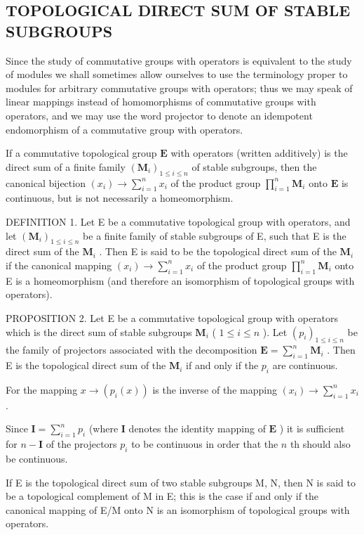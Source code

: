 \subsection{TOPOLOGICAL DIRECT SUM OF STABLE SUBGROUPS}

Since the study of commutative groups with operators is equivalent to the study of modules we shall sometimes allow ourselves to use the terminology proper to modules for arbitrary commutative groups with operators; thus we may speak of linear mappings instead of homomorphisms of commutative groups with operators, and we may use the word projector to denote an idempotent endomorphism of a commutative group with operators.

If a commutative topological group \(\mathbf{E}\) with operators (written additively) is the direct sum of a finite family \((\mathbf{M}_i)_{1 \leqslant i \leqslant n}\) of stable subgroups, then the canonical bijection \((x_i) \to \sum_{i=1}^{n} x_i\) of the product group \(\prod_{i=1}^{n} \mathbf{M}_i\) onto \(\mathbf{E}\) is continuous, but is not necessarily a homeomorphism.

DEFINITION 1. Let E be a commutative topological group with operators, and let \((\mathbf{M}_i)_{1 \leqslant i \leqslant n}\) be a finite family of stable subgroups of E, such that E is the direct sum of the \(\mathbf{M}_i\) . Then E is said to be the topological direct sum of the \(\mathbf{M}_i\) if the canonical mapping \((x_i) \to \sum_{i=1}^{n} x_i\) of the product group \(\prod_{i=1}^{n} \mathbf{M}_i\) onto E is a homeomorphism (and therefore an isomorphism of topological groups with operators).

PROPOSITION 2. Let E be a commutative topological group with operators which is the direct sum of stable subgroups \(\mathbf{M}_i\) ( \(1 \leqslant i \leqslant n\) ). Let \((p_i)_{1 \leqslant i \leqslant n}\) be the family of projectors associated with the decomposition \(\mathbf{E} = \sum_{i=1}^{n} \mathbf{M}_i\) . Then E is the topological direct sum of the \(\mathbf{M}_i\) if and only if the \(p_i\) are continuous.

For the mapping \(x \to (p_i(x))\) is the inverse of the mapping \((x_i) \to \sum_{i=1}^{n} x_i\) .

Since \(\mathbf{I} = \sum_{i=1}^{n} p_i\) (where \(\mathbf{I}\) denotes the identity mapping of \(\mathbf{E}\) ) it is sufficient for \(n - \mathbf{I}\) of the projectors \(p_i\) to be continuous in order that the \(n\) th should also be continuous.

If E is the topological direct sum of two stable subgroups M, N, then N is said to be a topological complement of M in E; this is the case if and only if the canonical mapping of E/M onto N is an isomorphism of topological groups with operators.

